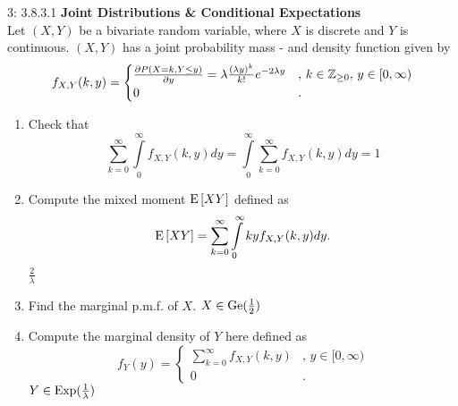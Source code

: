 \documentclass[a4paper,twoside=false,abstract=false,numbers=noenddot,
titlepage=false,headings=small,parskip=half,version=last]{scrartcl}
\begin{document}
\pagebreak


\begin{exercise}{3: 3.8.3.1}
    \textbf{Joint Distributions \& Conditional Expectations} \\
    Let $(X, Y)$ be a bivariate random variable, where $X$ is discrete and $Y$
    is continuous. $(X, Y)$ has a joint probability mass - and density function
    given by
    \begin{equation}
        f_{X,Y}(k, y) = \begin{cases}
            \frac{\partial{P(X=k, Y\le y)}}{\partial{y}} =
            \lambda\frac{(\lambda y)^k}{k!}e^{-2\lambda y}
                    &,\, k\in\mathbb{Z}_{\ge 0},\, y\in [0, \infty) \\
            0       &.
        \end{cases}
    \end{equation}
    \begin{enumerate}
        \item Check that
            \begin{equation}
                \sum\limits_{k=0}^\infty \int\limits_0^\infty f_{X,Y}(k,y)dy =
                \int\limits_0^\infty \sum\limits_{k=0}^\infty f_{X,Y}(k,y)dy = 1
            \end{equation}

        \item \label{itm:b} Compute the mixed moment ${\rm E}\,[XY]$ defined as
            \begin{equation}
                {\rm E}\,[XY] =
                \sum\limits_{k=0}^\infty \int\limits_0^\infty kyf_{X,Y}(k,y)dy.
            \end{equation}
            \Answer $\frac{2}{\lambda}$

        \item Find the marginal p.m.f. of $X$.
            \Answer $X\in\text{Ge}(\frac{1}{2})$

        \item Compute the marginal density of $Y$ here defined as
            \begin{equation}
                f_Y(y) = \begin{cases}
                    \sum\limits_{k=0}^\infty f_{X,Y}(k,y) &, \, y\in[0,\infty) \\
                     0                                    &.
                \end{cases}
            \end{equation}
            \Answer $Y\in\text{Exp}(\frac{1}{\lambda})$


\end{enumerate}
\end{exercise}
\end{document}
